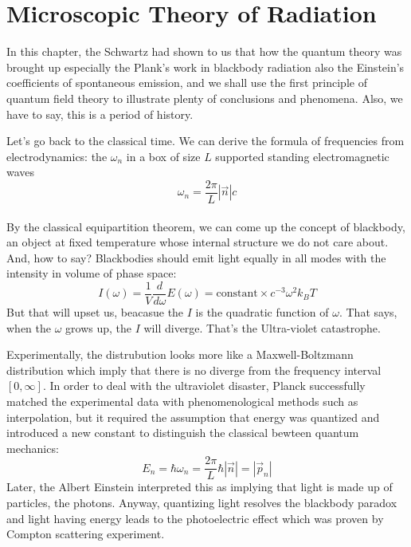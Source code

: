 \documentclass[12pt,openany]{book}
\begin{document}
	\chapter{Microscopic Theory of Radiation}
	In this chapter, the Schwartz had shown to us that how the quantum theory was brought up especially the Plank's work in 
	blackbody radiation also the Einstein's coefficients of spontaneous emission, and we shall use the first principle of quantum field theory
	to illustrate plenty of conclusions and phenomena. Also, we have to say, this is a period of history.\par 
	Let's go back to the classical time. We can derive the formula of frequencies from electrodynamics: the $\omega_n$ in a box of size
	$L$ supported standing electromagnetic waves
	\begin{equation}
		\omega_n=\frac{2\pi}{L}|\vec{n}|c
	\end{equation}\\
	By the classical equipartition theorem, we can come up the concept of blackbody, an object at fixed temperature whose internal structure we do not care about. And, how to say? Blackbodies
	should emit light equally in all modes with the intensity in volume of phase space:
	\begin{equation}
		I(\omega)=\frac{1}{V}\frac{d}{d\omega}E(\omega)=\text{constant}\times c^{-3}\omega^2k_BT
	\end{equation}
	But that will upset us, beacasue the $I$ is the quadratic function of $\omega$. That says, when the $\omega$ grows up, the $I$ will diverge.
    That's the Ultra-violet catastrophe.\par 
    Experimentally, the distrubution looks more like a Maxwell-Boltzmann distribution which imply that there is 
    no diverge from the frequency interval $[0,\infty]$. In order to deal with the ultraviolet disaster, 
    Planck successfully matched the experimental data with phenomenological methods such as interpolation, 
    but it required the assumption that energy was quantized and introduced a new constant to distinguish the 
    classical bewteen quantum mechanics:
    \begin{equation}
    	E_n=\hbar\omega_n=\frac{2\pi}{L}\hbar|\vec{n}|=|\vec{p}_n|
    \end{equation}
    Later, the Albert Einstein interpreted this as implying that light is made up of particles, the photons. Anyway, 
    quantizing light resolves the blackbody paradox and light having energy leads to the photoelectric effect which was
    proven by Compton scattering experiment. \par 
\end{document}
